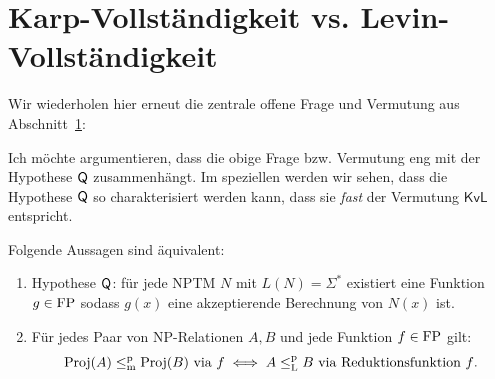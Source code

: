 \section{Karp-Vollständigkeit vs. Levin-Vollständigkeit}

Wir wiederholen hier erneut die zentrale offene Frage und Vermutung aus Abschnitt~\ref{}:

\questionkvl*

\conjkvl*

Ich möchte argumentieren, dass die obige Frage bzw. Vermutung eng mit der Hypothese $\mathsf{Q}$ zusammenhängt.
Im speziellen werden wir sehen, dass die Hypothese $\mathsf{Q}$ so charakterisiert werden kann, dass sie \emph{fast} der Vermutung $\mathsf{KvL}$ entspricht.

\begin{theorem}\label{thm:q-as-levin}
    Folgende Aussagen sind äquivalent:
    \begin{enumerate}
        \item Hypothese $\mathsf{Q}$: für jede NPTM $N$ mit $L(N)=\Sigma^*$ existiert eine Funktion $g\in\mathrm{FP}$ sodass $g(x)$ eine akzeptierende Berechnung von $N(x)$ ist. 
        \item Für jedes Paar von NP-Relationen $A, B$ und jede Funktion $f\in\mathrm{FP}$ gilt:
            \[ \operatorname{Proj}(A) \leq_\mathrm{m}^\mathrm{p} \operatorname{Proj}(B) \text{ via $f$} \iff A \leq_\mathrm{L}^\mathrm{p} B \text{ via Reduktionsfunktion $f$}. \]
    \end{enumerate}
\end{theorem}
